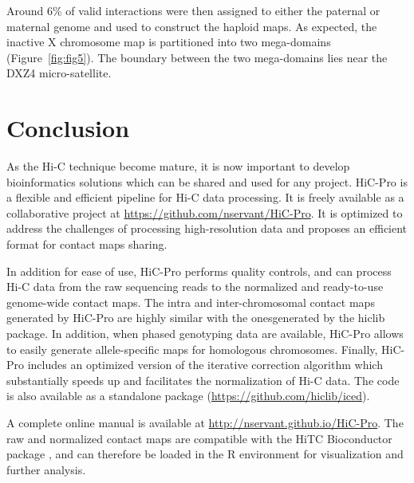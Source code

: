 Around 6\% of valid interactions were then assigned to either the paternal or
maternal genome and used to construct the haploid maps. As expected, the
inactive X chromosome map is partitioned into two mega-domains
(Figure~\ref{fig:fig5}). The
boundary between the two mega-domains lies near the DXZ4 micro-satellite.

\section{Conclusion}

As the Hi-C technique become mature, it is now important to develop
bioinformatics solutions which can be shared and used for any project. HiC-Pro
is a flexible and efficient pipeline for Hi-C data processing. It is freely
available as a collaborative project at
\href{https://github.com/nservant/HiC-Pro}{https://github.com/nservant/HiC-Pro}.
It is optimized to address the challenges of processing high-resolution data
and proposes an efficient format for contact maps sharing.

In addition for ease of use, HiC-Pro performs quality controls, and can
process Hi-C data from the raw sequencing reads to the normalized and
ready-to-use genome-wide contact maps. The intra and inter-chromosomal contact
maps generated by HiC-Pro are highly similar with the onesgenerated by the
hiclib package. In addition, when phased genotyping data are available,
HiC-Pro allows to easily generate allele-specific maps for homologous
chromosomes. Finally, HiC-Pro includes an optimized version of the iterative
correction algorithm which substantially speeds up and facilitates the
normalization of Hi-C data. The code is also available as a standalone package
(\href{https://github.com/hiclib/iced}{https://github.com/hiclib/iced}).

A complete online manual is available at
\href{http://nservant.github.io/HiC-Pro}{http://nservant.github.io/HiC-Pro}.
The raw and normalized contact maps are compatible with the HiTC Bioconductor
package \citep{servant:hitc}, and can therefore be loaded in the R environment for
visualization and further analysis.
